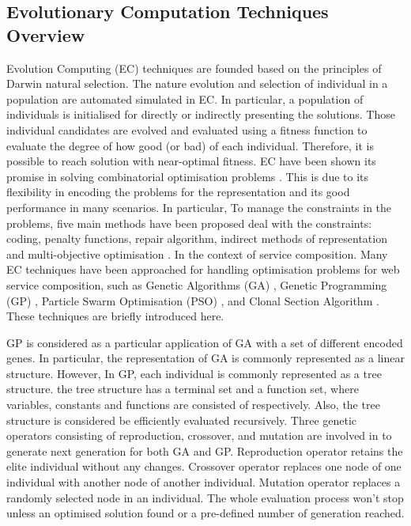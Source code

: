 \subsection{Evolutionary Computation Techniques Overview}\label{ec}

Evolution Computing (EC) techniques are founded based on the principles of Darwin natural selection. The nature evolution and selection of individual in a population are automated simulated in EC. In particular, a population of individuals is initialised for directly or indirectly presenting the solutions. Those individual candidates are evolved and evaluated using a fitness function to evaluate the degree of how good (or bad) of each individual. Therefore, it is possible to reach solution with near-optimal fitness. EC have been shown its promise in solving combinatorial optimisation problems \cite{back1997evolutionary}. This is due to its flexibility in encoding the problems for the representation and its good performance in many scenarios. In particular, To manage the constraints in the problems, five main methods have been proposed deal with the constraints: coding, penalty functions, repair algorithm, indirect methods of representation and multi-objective optimisation \cite{fleming2002evolutionary}. In the context of service composition. Many EC techniques have been approached for handling optimisation problems for web service composition, such as Genetic Algorithms (GA) \cite{whitley1994genetic}, Genetic Programming (GP) \cite{koza1992genetic}, Particle Swarm Optimisation (PSO) \cite{kennedy1995particle}, and Clonal Section Algorithm \cite{de2002learning}. These techniques are briefly introduced here.

GP is considered as a particular application of GA with a set of different encoded genes. In particular, the representation of GA is commonly represented as a linear structure. However, In GP, each individual is commonly represented as a tree structure. the tree structure has a terminal set and a function set, where variables, constants and functions are consisted of respectively. Also,  the tree structure is considered be efficiently evaluated recursively. Three genetic operators consisting of reproduction, crossover, and mutation are involved in to generate next generation for both GA and GP. Reproduction operator retains the elite individual without any changes. Crossover operator replaces one node of one individual with another node of another individual. Mutation operator replaces a randomly selected node in an individual. The whole evaluation process won't stop unless an optimised solution found or a pre-defined number of generation reached.

